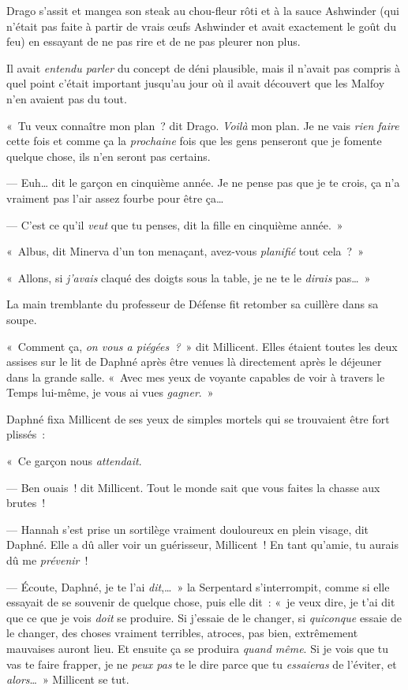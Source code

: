 \later

Drago s'assit et mangea son steak au chou-fleur rôti et à la sauce Ashwinder (qui n'était pas faite à partir de vrais œufs Ashwinder et avait exactement le goût du feu) en essayant de ne pas rire et de ne pas pleurer non plus.

Il avait \emph{entendu parler} du concept de déni plausible, mais il n'avait pas compris à quel point c'était important jusqu'au jour où il avait découvert que les Malfoy n'en avaient pas du tout.

«~Tu veux connaître mon plan~? dit Drago. \emph{Voilà} mon plan. Je ne vais \emph{rien faire} cette fois et comme ça la \emph{prochaine} fois que les gens penseront que je fomente quelque chose, ils n'en seront pas certains.

--- Euh… dit le garçon en cinquième année. Je ne pense pas que je te crois, ça n'a vraiment pas l'air assez fourbe pour être ça…

--- C'est ce qu'il \emph{veut} que tu penses, dit la fille en cinquième année.~»

\later

«~Albus, dit Minerva d'un ton menaçant, avez-vous \emph{planifié} tout cela~?~»

\later

«~Allons, si \emph{j'avais} claqué des doigts sous la table, je ne te le \emph{dirais} pas…~»

\later

La main tremblante du professeur de Défense fit retomber sa cuillère dans sa soupe.

\later

«~Comment ça, \emph{on vous a piégées~?}~» dit Millicent. Elles étaient toutes les deux assises sur le lit de Daphné après être venues là directement après le déjeuner dans la grande salle. «~Avec mes yeux de voyante capables de voir à travers le Temps lui-même, je vous ai vues \emph{gagner}.~»

Daphné fixa Millicent de ses yeux de simples mortels qui se trouvaient être fort plissés~:

«~Ce garçon nous \emph{attendait}.

--- Ben ouais~! dit Millicent. Tout le monde sait que vous faites la chasse aux brutes~!

--- Hannah s'est prise un sortilège vraiment douloureux en plein visage, dit Daphné. Elle a dû aller voir un guérisseur, Millicent~! En tant qu'amie, tu aurais dû me \emph{prévenir}~!

--- Écoute, Daphné, je te l'ai \emph{dit},…~» la Serpentard s'interrompit, comme si elle essayait de se souvenir de quelque chose, puis elle dit~: «~je veux dire, je t'ai dit que ce que je vois \emph{doit} se produire. Si j'essaie de le changer, si \emph{quiconque} essaie de le changer, des choses vraiment terribles, atroces, pas bien, extrêmement mauvaises auront lieu. Et ensuite ça se produira \emph{quand même}. Si je vois que tu vas te faire frapper, je ne \emph{peux pas} te le dire parce que tu \emph{essaieras} de l'éviter, et \emph{alors}…~» Millicent se tut.

